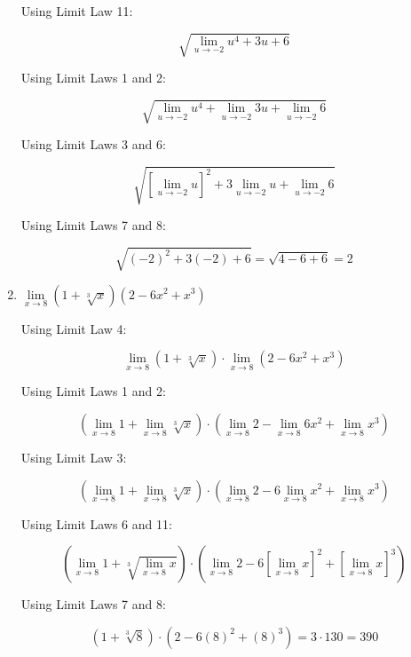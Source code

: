 \documentclass{article}
\begin{document}
\begin{enumerate}
			Using Limit Law 11:
			
			$$\sqrt{\lim \limits _{u \to -2} u^4 + 3u +6}$$
			
			Using Limit Laws 1 and 2:
			
			$$\sqrt{\lim \limits _{u \to -2} u^4 + \lim \limits _{u \to -2} 3u + \lim \limits _{u \to -2} 6}$$
			
			Using Limit Laws 3 and 6:
			
			$$\sqrt{[\lim \limits _{u \to -2} u]^2 + 3 \lim \limits _{u \to -2} u + \lim \limits _{u \to -2} 6}$$
			
			Using Limit Laws 7 and 8:
			
			$$\sqrt{(-2) ^2 + 3(-2) + 6} = \sqrt{4 - 6 + 6} = 2$$
			
		\item $\lim \limits _{x \to 8} ( 1 + \sqrt[3]{x})(2 - 6x^2 + x^3)$
		
		Using Limit Law 4:
		
			$$\lim \limits _{x \to 8} (1 + \sqrt[3]{x}) \cdot \lim \limits _{x \to 8} (2 -6x^2 + x^3)$$
			
		Using Limit Laws 1 and 2:
		
			$$(\lim \limits _{x \to 8} 1 + \lim \limits _{x \to 8} \sqrt[3]{x}) \cdot 
				(\lim \limits _{x \to 8} 2 - \lim \limits _{x \to 8} 6x^2 + \lim\limits _{x \to 8} x^3)$$
				
		Using Limit Law 3:
				
			$$(\lim \limits _{x \to 8} 1 + \lim \limits _{x \to 8} \sqrt[3]{x}) \cdot 
				(\lim \limits _{x \to 8} 2 - 6 \lim \limits _{x \to 8} x^2 + \lim\limits _{x \to 8} x^3)$$
				
		Using Limit Laws 6 and 11:
		
			$$(\lim \limits _{x \to 8} 1 +  \sqrt[3]{\lim \limits _{x \to 8} x}) \cdot 
				(\lim \limits _{x \to 8} 2 - 6 [\lim \limits _{x \to 8} x]^2 + [\lim\limits _{x \to 8} x]^3)$$
				
		Using Limit Laws 7 and 8:
		
			$$( 1 +  \sqrt[3]{8}) \cdot 
				( 2 - 6(8)^2 + (8)^3) = 3 \cdot 130 = 390$$		
		
	\end{enumerate}
\end{document}
